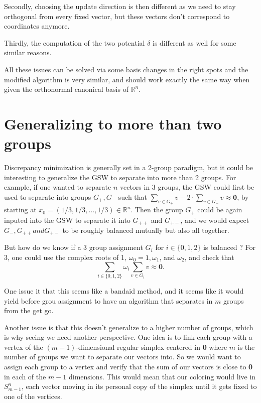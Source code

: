 \documentclass[12pt]{article}
\begin{document}
Secondly, choosing the update direction is then different as we need to stay orthogonal from every fixed vector, but these vectors don't correspond to coordinates anymore.

Thirdly, the computation of the two potential $\delta$ is different as well for some similar reasons.

All these issues can be solved via some basis changes in the right spots and the modified algorithm is very similar, and should work exactly the same way when given the orthonormal canonical basis of $\mathbb{R}^n$.

\section{Generalizing to more than two groups}
Discrepancy minimization is generally set in a 2-group paradigm, but it could be interesting to generalize the GSW to separate into more than 2 groups. For example, if one wanted to separate $n$ vectors in 3 groups, the GSW could first be used to separate into groups $G_+,G_-$ such that $\sum_{v\in G_+}v-2\cdot\sum_{v\in G_-}v\approx \textbf{0}$, by starting at $x_0=(1/3,1/3,\dots,1/3)\in\mathbb{R}^n$. Then the group $G_+$ could be again inputed into the GSW to separate it into $G_{++}$ and $G_{+-}$, and we would expect $G_-,G_{++} and G_{+-}$ to be roughly balanced mutually but also all together.

But how do we know if a 3 group assignment $G_i$ for $i\in\{0,1,2\}$ is balanced ? For 3, one could use the complex roots of 1, $\omega_0=1 ,\omega_1$, and $\omega_2$, and check that $$\sum_{i\in\{0,1,2\}}\omega_i\sum_{v\in G_i}v\approx\textbf{0}.$$

One issue it that this seems like a bandaid method, and it seems like it would yield before grou assignment to have an algorithm that separates in $m$ groups from the get go.

Another issue is that this doesn't generalize to a higher number of groups, which is why seeing we need another perspective. One  idea is to link each group with a vertex of the $(m-1)$-dimensional regular simplex centered in \textbf{0} where $m$ is the number of groups we want to separate our vectors into. So we would want to assign each group to a vertex and verify that the sum of our vectors is close to \textbf{0} in each of the $m-1$ dimensions. This would mean that our coloring would live in $S_{m-1}^n$, each vector moving in its personal copy of the simplex until it gets fixed to one of the vertices.
\end{document}
